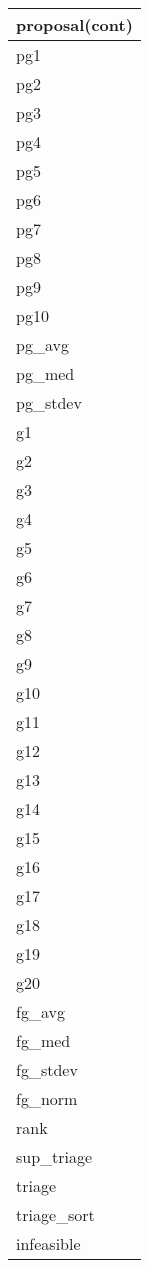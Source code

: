 \documentclass{article}
\begin{document}

\begin{tabular}{|l|} \hline
\textbf{proposal(cont)} \\ \hline
pg1 \\ \hline
pg2 \\ \hline
pg3 \\ \hline
pg4 \\ \hline
pg5 \\ \hline
pg6 \\ \hline
pg7 \\ \hline
pg8 \\ \hline
pg9 \\ \hline
pg10 \\ \hline
pg\_avg \\ \hline
pg\_med \\ \hline
pg\_stdev \\ \hline
g1 \\ \hline
g2 \\ \hline
g3 \\ \hline
g4 \\ \hline
g5 \\ \hline
g6 \\ \hline
g7 \\ \hline
g8 \\ \hline
g9 \\ \hline
g10 \\ \hline
g11 \\ \hline
g12 \\ \hline
g13 \\ \hline
g14 \\ \hline
g15 \\ \hline
g16 \\ \hline
g17 \\ \hline
g18 \\ \hline
g19 \\ \hline
g20 \\ \hline
fg\_avg \\ \hline
fg\_med \\ \hline
fg\_stdev \\ \hline
fg\_norm \\ \hline
rank \\ \hline
sup\_triage \\ \hline
triage \\ \hline
triage\_sort \\ \hline
infeasible \\ \hline
\end{tabular}
\end{document}
